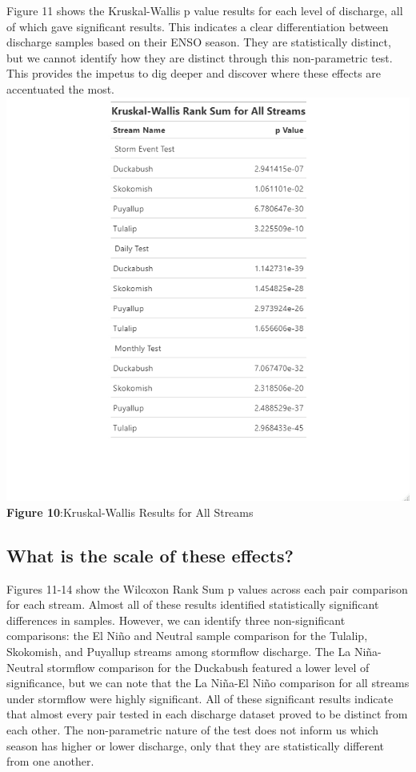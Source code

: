 \documentclass[
  12pt,
]{article}
\begin{document}
Figure 11 shows the Kruskal-Wallis p value results for each level of
discharge, all of which gave significant results. This indicates a clear
differentiation between discharge samples based on their ENSO season.
They are statistically distinct, but we cannot identify how they are
distinct through this non-parametric test. This provides the impetus to
dig deeper and discover where these effects are accentuated the most.
\includegraphics{Data/Processed/Tables/KTTable.jpeg} \textbf{Figure
10}:Kruskal-Wallis Results for All Streams

\hypertarget{what-is-the-scale-of-these-effects}{%
\subsection{What is the scale of these
effects?}\label{what-is-the-scale-of-these-effects}}

Figures 11-14 show the Wilcoxon Rank Sum p values across each pair
comparison for each stream. Almost all of these results identified
statistically significant differences in samples. However, we can
identify three non-significant comparisons: the El Niño and Neutral
sample comparison for the Tulalip, Skokomish, and Puyallup streams among
stormflow discharge. The La Niña-Neutral stormflow comparison for the
Duckabush featured a lower level of significance, but we can note that
the La Niña-El Niño comparison for all streams under stormflow were
highly significant. All of these significant results indicate that
almost every pair tested in each discharge dataset proved to be distinct
from each other. The non-parametric nature of the test does not inform
us which season has higher or lower discharge, only that they are
statistically different from one another.
\end{document}
